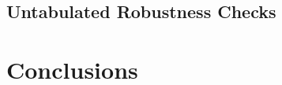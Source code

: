\documentclass[a4paper]{article}
\begin{document}
\begin{spacing}{2}
\subsection{Untabulated Robustness Checks}

\section{Conclusions}


\end{spacing}

\newpage



\newpage


\newpage


\newpage


\newpage
\setcounter{page}{1}

\end{document}
